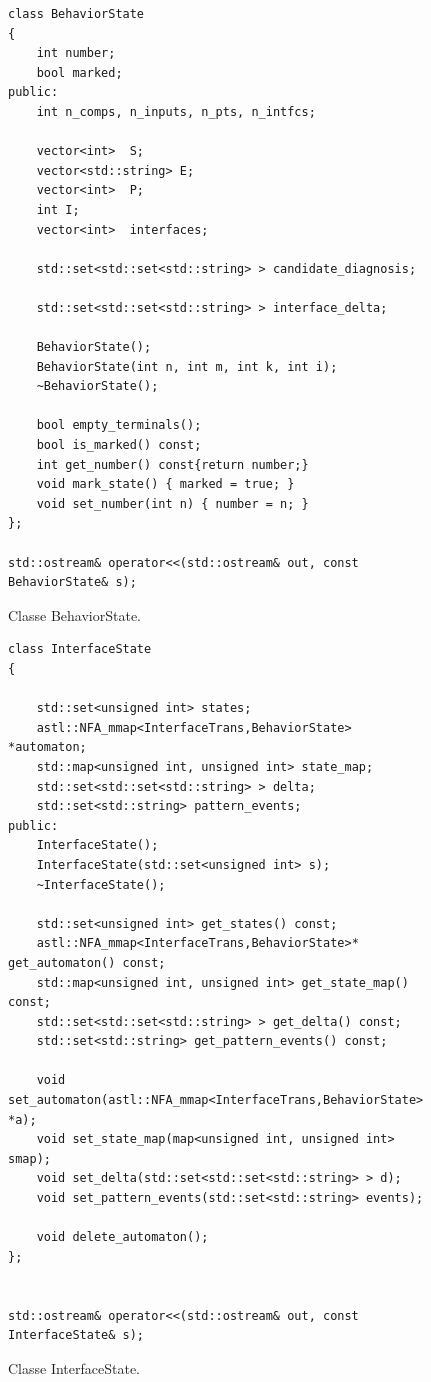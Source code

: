 \begin{figure}[htbp]
\begin{verbatim}
class BehaviorState
{
    int number;
    bool marked;
public:
    int n_comps, n_inputs, n_pts, n_intfcs;

    vector<int>  S;
    vector<std::string> E;
    vector<int>  P;
    int I;
    vector<int>  interfaces;

    std::set<std::set<std::string> > candidate_diagnosis;

    std::set<std::set<std::string> > interface_delta;

    BehaviorState();
    BehaviorState(int n, int m, int k, int i);
    ~BehaviorState();

    bool empty_terminals();
    bool is_marked() const;
    int get_number() const{return number;}
    void mark_state() { marked = true; }
    void set_number(int n) { number = n; }
};

std::ostream& operator<<(std::ostream& out, const BehaviorState& s);
\end{verbatim}
\caption{Classe BehaviorState.}
\label{code:lazy_bhvstate}
\end{figure}


\begin{figure}[htbp]
\begin{verbatim}
class InterfaceState
{

    std::set<unsigned int> states;
    astl::NFA_mmap<InterfaceTrans,BehaviorState> *automaton;
    std::map<unsigned int, unsigned int> state_map;
    std::set<std::set<std::string> > delta;
    std::set<std::string> pattern_events;
public:
    InterfaceState();
    InterfaceState(std::set<unsigned int> s);
    ~InterfaceState();

    std::set<unsigned int> get_states() const;
    astl::NFA_mmap<InterfaceTrans,BehaviorState>* get_automaton() const;
    std::map<unsigned int, unsigned int> get_state_map() const;
    std::set<std::set<std::string> > get_delta() const;
    std::set<std::string> get_pattern_events() const;

    void set_automaton(astl::NFA_mmap<InterfaceTrans,BehaviorState> *a);
    void set_state_map(map<unsigned int, unsigned int> smap);
    void set_delta(std::set<std::set<std::string> > d);
    void set_pattern_events(std::set<std::string> events);

    void delete_automaton();
};


std::ostream& operator<<(std::ostream& out, const InterfaceState& s);
\end{verbatim}
\caption{Classe InterfaceState.}
\label{code:lazy_interstate}
\end{figure}